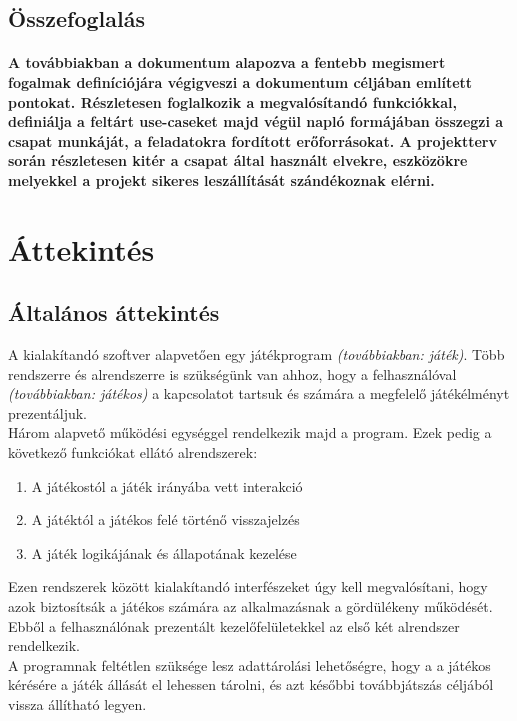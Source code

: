 \subsection{Összefoglalás}
\paragraph{
    A továbbiakban a dokumentum alapozva a fentebb megismert fogalmak definíciójára végigveszi a dokumentum céljában
    említett pontokat. Részletesen foglalkozik a megvalósítandó funkciókkal, definiálja a feltárt use-caseket majd végül
    napló formájában összegzi a csapat munkáját, a feladatokra fordított erőforrásokat. A projektterv során részletesen kitér
    a csapat által használt elvekre, eszközökre melyekkel a projekt sikeres leszállítását szándékoznak elérni. 
}

\section{Áttekintés}

\subsection{Általános áttekintés}

\indent A kialakítandó szoftver alapvetően egy játékprogram \emph{(továbbiakban: játék)}. Több rendszerre és alrendszerre is szükségünk van ahhoz, hogy a felhasználóval \emph{(továbbiakban: játékos)} a kapcsolatot tartsuk és számára a megfelelő játékélményt prezentáljuk.\\
\indent Három alapvető működési egységgel rendelkezik majd a program. Ezek pedig a következő funkciókat ellátó alrendszerek:
\begin{enumerate}
	\setlength\itemsep{0pt}
	\item A játékostól a játék irányába vett interakció
	\item A játéktól a játékos felé történő visszajelzés 
	\item A játék logikájának és állapotának kezelése
\end{enumerate}
Ezen rendszerek között kialakítandó interfészeket úgy kell megvalósítani, hogy azok biztosítsák a játékos számára az alkalmazásnak a gördülékeny működését. Ebből a felhasználónak prezentált kezelőfelületekkel az első két alrendszer rendelkezik.\\
\indent A programnak feltétlen szüksége lesz adattárolási lehetőségre, hogy a a játékos kérésére a játék állását el lehessen tárolni, és azt későbbi továbbjátszás céljából vissza állítható legyen.

